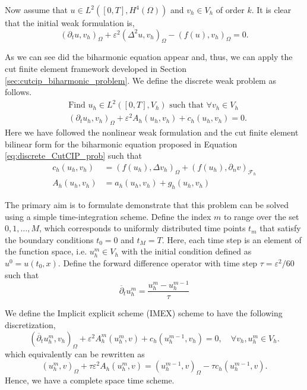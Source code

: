 Now assume that $u \in L^2( [0,T], H^{4}( \Omega ) ) $ and $v_{h} \in  V_{h}$ of order $k$. It is clear that the initial weak formulation is,
\begin{equation}
    ( \partial_{t} u,v_{h} )_{\Omega }  + \varepsilon^{2} ( \Delta ^2u, v_{h})_{\Omega } -  ( f( u), v_{h} )_{\Omega } = 0.
\end{equation}

As we can see did the biharmonic equation appear and, thus, we can apply the cut finite element framework developed in Section \ref{sec:cutcip_biharmonic_problem}. We define the discrete weak problem as follows.
\begin{equation}
    \begin{split}
        & \text{Find  }u_{h} \in L^{2}( [0,T],V_{h})  \text{ such that } \forall v_{h} \in V_{h} \\
        & ( \partial_{t} u_{h},v_{h} )_{\Omega }   + \varepsilon^{2} A_{h}( u_{h},v_{h})   +  c_{h}( u_{h},v_{h})  = 0.
    \end{split}
\end{equation}
Here we have followed the nonlinear weak formulation \cite[Equation
4.2]{feng2007fully} and the cut finite element bilinear form for the biharmonic equation proposed in Equation \eqref{eq:discrete_CutCIP_prob} such that
\begin{align}
    c_{h}( u_{h}, v_{h})  & = ( f( u_{h}) ,\Delta v_{h})_{\Omega } +  ( f( u_{h}) , \partial _{n}v)_{\mathcal{F}_{h} } \\
    A_{h}( u_{h}, v_{h})  & =  a_{h}( u_{h}, v_{h}) + g_{h}( u_{h}, v_{h})
\end{align}

The primary aim is to formulate demonstrate that this problem can be solved using a simple time-integration scheme. Define the index $m$ to range over the set ${0, 1, \ldots, M}$, which corresponds to uniformly distributed time points $t_{m}$ that satisfy the boundary conditions $t_{0} = 0$
and $t_{M} = T$. Here, each time step is an element of the function space, i.e. $u^{m}_{h} \in V_{h}$  with the initial condition defined as $u^{0} = u( t_{0},x )$.
Define the forward difference operator with time step $\tau = \varepsilon^{2} /60 $ such that
\begin{equation}
\overline{\partial } _{t} u_{h}^{m} = \frac{u_{h}^{m} - u_{h}^{m-1}}{ \tau }
\end{equation}

We define the Implicit explicit scheme (IMEX) scheme to have the following discretization,
\begin{equation}
( \overline{\partial } _{t} u^{m}_{h}, v_{h}   )_{\Omega } + \varepsilon^{2} A^{m}_{h}( u_{h}^{m} , v) +  c_{h} (  u_{h}^{m-1}, v_{h})  = 0 , \quad \forall v_{h}, u^{m}_{h} \in V^{}_{h}.
\end{equation}
which equivalently can be rewritten as
\begin{equation}
( u_{h}^{m},v )_{\Omega }  + \tau \varepsilon^{2} A_{h}( u_{h}^{m} , v)   =  ( u_{h}^{m-1},v )_{\Omega } - \tau c_{h} (  u_{h}^{m-1}, v) .
\end{equation}
Hence, we have a complete space time scheme.


